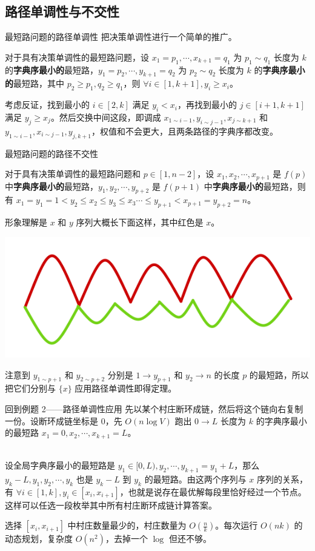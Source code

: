 \documentclass{beamer}
\begin{document}
\subsection{路径单调性与不交性}
\begin{frame}{最短路问题的路径单调性}
	把决策单调性进行一个简单的推广。
	\begin{theorem}
		对于具有决策单调性的最短路问题，设 $x_1=p_1,\cdots,x_{k+1}=q_1$ 为 $p_1 \sim q_1$ 长度为 $k$ 的\textbf{字典序最小的}最短路，$y_1=p_2,\cdots,y_{k+1}=q_2$ 为 $p_2 \sim q_2$ 长度为 $k$ 的\textbf{字典序最小的}最短路，其中 $p_2 \geq p_1,q_2 \geq q_1$，则 $\forall i \in [1,k+1],y_i \geq x_i$。
	\end{theorem}\pause
	考虑反证，找到最小的 $i \in [2,k]$ 满足 $y_i < x_i$，再找到最小的 $j \in [i+1,k+1]$ 满足 $y_j \geq x_j$。然后交换中间这段，即调成 $x_{1\sim i-1},y_{i\sim j-1},x_{j\sim k+1}$ 和 $y_{1 \sim i-1},x_{i\sim j-1},y_{j,k+1}$，权值和不会更大，且两条路径的字典序都改变。
\end{frame}
\begin{frame}{最短路问题的路径不交性}
	\begin{theorem}
		对于具有决策单调性的最短路问题和 $p \in [1,n-2]$，设 $x_1,x_2,\cdots,x_{p+1}$ 是 $f(p)$ 中\textbf{字典序最小的}最短路，$y_1,y_2,\cdots,y_{p+2}$ 是 $f(p+1)$ 中\textbf{字典序最小的}最短路，则有 $x_1=y_1=1 < y_2 \leq x_2 \leq y_3 \leq x_3 \cdots \leq y_{p+1} < x_{p+1}=y_{p+2}=n$。
\end{theorem}
形象理解是 $x$ 和 $y$ 序列大概长下面这样，其中红色是 $x$。
\begin{center}
\includegraphics[scale=0.2]{picture/pic1.png}
\end{center}
注意到 $y_{1 \sim p+1}$ 和 $y_{2 \sim p+2}$ 分别是 $1 \rightarrow y_{p+1}$ 和 $y_2 \rightarrow n$ 的长度 $p$ 的最短路，所以把它们分别与 $\{x\}$ 应用路径单调性即得定理。
\end{frame}
\begin{frame}{回到例题 2——路径单调性应用}
	先以某个村庄断环成链，然后将这个链向右复制一份。设断环成链坐标是 $0$，先 $O(n \log V)$ 跑出 $0 \rightarrow L$ 长度为 $k$ 的字典序最小的最短路 $x_1=0,x_2,\cdots,x_{k+1}=L$。
	
	~\\
	
	设全局字典序最小的最短路是 $y_1\in[0,L),y_2,\cdots,y_{k+1}=y_1+L$，那么 $y_k-L,y_1,y_2,\cdots,y_k$ 也是 $y_k-L$ 到 $y_k$ 的最短路。由这两个序列与 $x$ 序列的关系，有 $\forall i\in[1,k],y_i \in [x_i,x_{i+1}]$，也就是说存在最优解每段里恰好经过一个节点。这样可以任选一段枚举其中所有村庄断环成链计算答案。
	
	选择 $[x_i,x_{i+1}]$ 中村庄数量最少的，村庄数量为 $O(\frac{n}{k})$。每次运行 $O(nk)$ 的动态规划，复杂度 $O(n^2)$，去掉一个 $\log$ 但还不够。
\end{frame}
\end{document}
